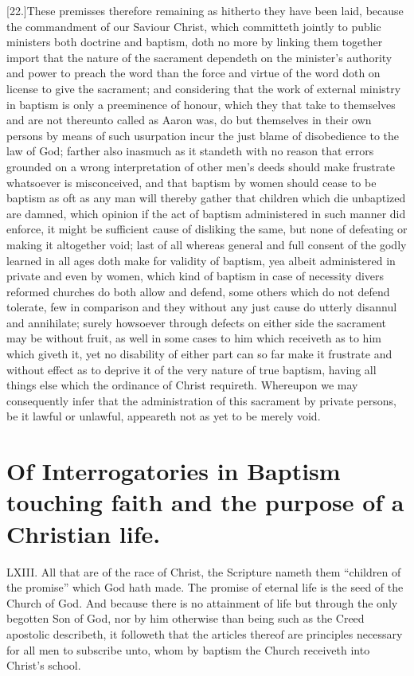 [22.]These premisses therefore remaining as hitherto they have been laid, because the commandment of our Saviour Christ, which committeth jointly to public ministers both doctrine and baptism, doth no more by linking them together import that the nature of the sacrament dependeth on the minister’s authority and power to preach the word than the force and virtue of the word doth on license to give the sacrament; and considering that the work of external ministry in baptism is only a preeminence of honour, which they that take to themselves and are not thereunto called as Aaron was, do but themselves in their own persons by means of such usurpation incur the just blame of disobedience to the law of God; farther also inasmuch as it standeth with no  reason that errors grounded on a wrong interpretation of other men’s deeds should make frustrate whatsoever is misconceived,
 and that baptism by women should cease to be baptism as oft as any man will thereby gather that children which die unbaptized are damned, which opinion if the act of baptism administered in such manner did enforce, it might be sufficient cause of disliking the same, but none of defeating or making it altogether void; last of all whereas general and full consent of the godly learned in all ages doth make for validity of baptism, yea albeit administered in private and even by women, which kind of baptism in case of necessity divers reformed churches do both allow and defend, some others which do not defend tolerate, few in comparison and they without any just cause do utterly disannul and annihilate; surely howsoever through defects on either side the sacrament may be without fruit, as well in some cases to him which receiveth as to him which giveth it, yet no disability of either part can so far make it frustrate and without effect as to deprive it of the very nature of true baptism, having all things else which the ordinance of Christ requireth. Whereupon we may consequently infer that the administration of this sacrament by private persons, be it lawful or unlawful, appeareth not as yet to be merely void.


\section*{Of Interrogatories in Baptism touching faith and the purpose of a Christian life.}
LXIII. All that are of the race of Christ, the Scripture nameth them “children of the promise” which God hath made. The promise of eternal life is the seed of the Church of God. And because there is no attainment of life but through the only begotten Son of God, nor by him otherwise than being such as the Creed apostolic describeth, it followeth that the articles thereof are principles necessary for all men to subscribe unto, whom by baptism the Church receiveth into Christ’s school.

